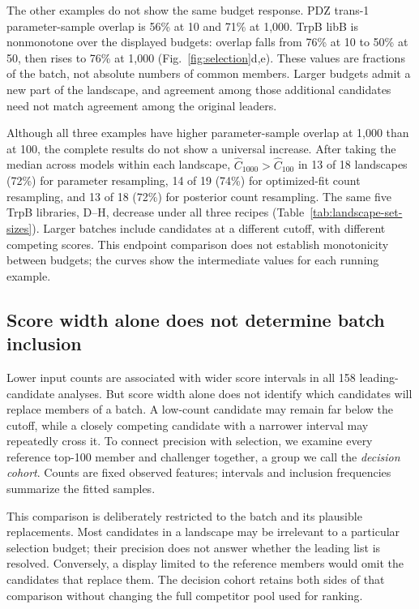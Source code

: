 \documentclass[11pt]{article}
\begin{document}
The other examples do not show the same budget response. PDZ trans-1
parameter-sample overlap is 56\% at 10 and 71\% at 1,000.
TrpB libB is nonmonotone over the displayed budgets: overlap falls
from 76\% at 10 to 50\% at 50, then rises to 76\% at 1,000
(Fig.~\ref{fig:selection}d,e). These values are fractions of the
batch, not absolute numbers of common members. Larger budgets admit
a new part of the landscape, and agreement among those additional
candidates need not match agreement among the original leaders.

Although all three examples have higher parameter-sample overlap at
1,000 than at 100, the complete results do not show a universal increase.
After taking the median across models within each landscape,
$\widehat C_{1000}>\widehat C_{100}$ in 13 of 18 landscapes (72\%) for
parameter resampling, 14 of 19 (74\%) for optimized-fit count resampling,
and 13 of 18 (72\%) for posterior count resampling. The same five TrpB
libraries, D--H, decrease under all three recipes
(Table~\ref{tab:landscape-set-sizes}). Larger batches include candidates
at a different cutoff, with different competing scores. This endpoint
comparison does not establish monotonicity between budgets; the curves
show the intermediate values for each running example.

\subsection{Score width alone does not determine batch inclusion}
\label{sec:mechanisms}

Lower input counts are associated with wider score intervals in all
158 leading-candidate analyses. But score width alone does not identify
which candidates will replace members of a batch. A low-count candidate
may remain far below the cutoff, while a closely competing candidate
with a narrower interval may repeatedly cross it. To connect precision
with selection, we examine every
reference top-100 member and challenger together, a group we call
the \emph{decision cohort}. Counts are fixed observed features;
intervals and inclusion frequencies summarize the fitted samples.

This comparison is deliberately restricted to the batch and its
plausible replacements. Most candidates in a landscape may be
irrelevant to a particular selection budget; their precision does
not answer whether the leading list is resolved. Conversely, a
display limited to the reference members would omit the candidates
that replace them. The decision cohort retains both sides of that
comparison without changing the full competitor pool used for ranking.
\end{document}
